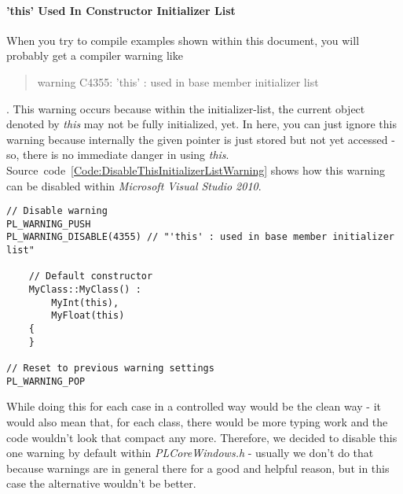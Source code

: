 \paragraph{'this' Used In Constructor Initializer List}
When you try to compile examples shown within this document, you will probably get a compiler warning like \begin{quote}warning C4355: 'this' : used in base member initializer list\end{quote}. This warning occurs because within the initializer-list, the current object denoted by \emph{this} may not be fully initialized, yet. In here, you can just ignore this warning because internally the given pointer is just stored but not yet accessed - so, there is no immediate danger in using \emph{this}. Source~code~\ref{Code:DisableThisInitializerListWarning} shows how this warning can be disabled within \emph{Microsoft Visual Studio 2010}.
\begin{lstlisting}[float=htb,label=Code:DisableThisInitializerListWarning,caption={Disable warning when using \emph{this} within the initializer list}]
// Disable warning
PL_WARNING_PUSH
PL_WARNING_DISABLE(4355) // "'this' : used in base member initializer list"

	// Default constructor
	MyClass::MyClass() :
		MyInt(this),
		MyFloat(this)
	{
	}

// Reset to previous warning settings
PL_WARNING_POP
\end{lstlisting}
While doing this for each case in a controlled way would be the clean way - it would also mean that, for each class, there would be more typing work and the code wouldn't look that compact any more. Therefore, we decided to disable this one warning by default within \emph{PLCoreWindows.h} - usually we don't do that because warnings are in general there for a good and helpful reason, but in this case the alternative wouldn't be better.




